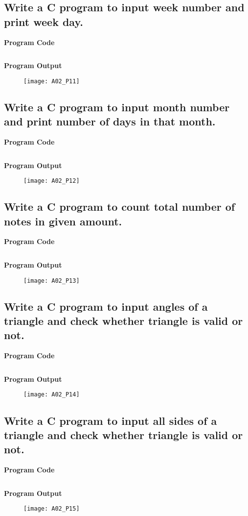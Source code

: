 \subsection{Write a C program to input week number and print week day.}
\textbf{Program Code}
\inputminted[breaklines]{C}{programs/A02_P11.c}
\textbf{Program Output}
\begin{figure}[h]
  \texttt{[image: A02\_P11]}
\end{figure}
\pagebreak

\subsection{Write a C program to input month number and print number of days in that month.}
\textbf{Program Code}
\inputminted[breaklines]{C}{programs/A02_P12.c}
\textbf{Program Output}
\begin{figure}[h]
  \texttt{[image: A02\_P12]}
\end{figure}
\pagebreak

\subsection{Write a C program to count total number of notes in given amount.}
\textbf{Program Code}
\inputminted[breaklines]{C}{programs/A02_P13.c}
\textbf{Program Output}
\begin{figure}[h]
  \texttt{[image: A02\_P13]}
\end{figure}
\pagebreak

\subsection{Write a C program to input angles of a triangle and check whether triangle is valid or not.}
\textbf{Program Code}
\inputminted[breaklines]{C}{programs/A02_P14.c}
\textbf{Program Output}
\begin{figure}[h]
  \texttt{[image: A02\_P14]}
\end{figure}
\pagebreak

\subsection{Write a C program to input all sides of a triangle and check whether triangle is valid or not.}
\textbf{Program Code}
\inputminted[breaklines]{C}{programs/A02_P15.c}
\textbf{Program Output}
\begin{figure}[h]
  \texttt{[image: A02\_P15]}
\end{figure}
\pagebreak

